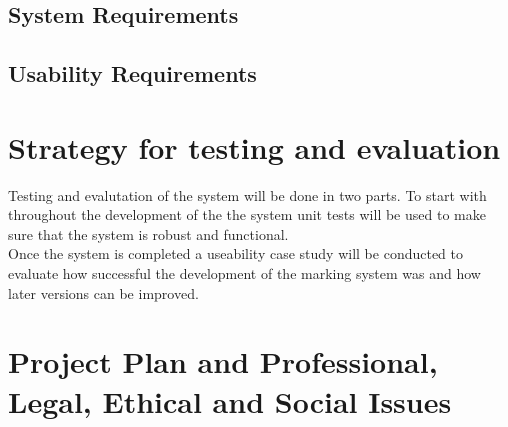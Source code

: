 \documentclass[12pt]{article}  %
\theoremstyle{definition}
\theoremstyle{remark}
\begin{document}
\subsection{System Requirements}
\subsection{Usability Requirements}

\newpage
\section{Strategy for testing and evaluation}

\doublespacing
Testing and evalutation of the system will be done in two parts. To start with throughout the development of the the system unit tests will be used to make sure that the system is robust and functional. \\
Once the system is completed a useability case study will be conducted to evaluate how successful the development of the marking system  was and how later versions can be improved.

\singlespacing

\newpage
\section{Project Plan and Professional, Legal, Ethical and Social Issues}
\end{document}
